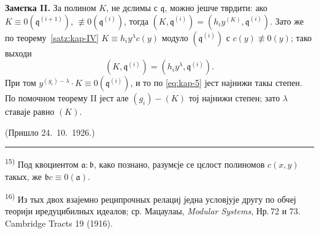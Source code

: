 \documentclass[11pt]{article}
\newcommand{\foreign}[1]{#1}
\theoremstyle{plain}
\begin{document}
\textbf{Замєтка II.} За полином $K$, не дєлимы с $\mathfrak{q}$,
можно јешче тврдити: ако
$K \equiv 0(\mathfrak{q}^{(i+1)})$,
$\not\equiv 0(\mathfrak{q}^{(i)})$, тогда
$(K, \mathfrak{q}^{(i)}) = (h_{i}y^{(K)}, \mathfrak{q}^{(i)})$.
Зато же по теорему~\ref{satz:kap-IV}
$K \equiv h_{i}y^{\lambda}c(y)$ модуло
$(\mathfrak{q}^{(i)})$ с $c(y) \not\equiv 0(y)$; тако выходи
\[
(K, \mathfrak{q}^{(i)}) = (h_{i}y^{\lambda}, \mathfrak{q}^{(i)}).
\]
При том $y^{(g_{i})-\lambda} \cdot K \equiv 0(\mathfrak{q}^{(i)})$,
и то по \eqref{eq:kap-5} јест најнижи такы степен. По помочном
теорему II јест але $(g_{i}) - (K)$ тој најнижи степен; зато
$\lambda$ ставаје равно $(K)$.

\vfill
\begin{flushright}
(Пришло 24.\ 10.\ 1926.)
\end{flushright}

\vspace{0.5em}
\noindent\rule{\textwidth}{0.4pt}
\vspace{0.3em}

{\footnotesize
\textsuperscript{15)} Под квоциентом $\mathfrak{a}:\mathfrak{b}$, како познано,
разумєје се цєлост полиномов $c(x,y)$ такых, же
$\mathfrak{b}c \equiv 0(\mathfrak{a})$.

\textsuperscript{16)} Из тых двох взајемно реципрочных релациј једна условјује
другу по обчеј теорији иредуцибилных идеалов; ср. Мацаулаы,
\textit{\foreign{Modular Systems}}, Нр.\,72 и 73. \foreign{Cambridge Tracts} 19 (1916).
}
\end{document}
